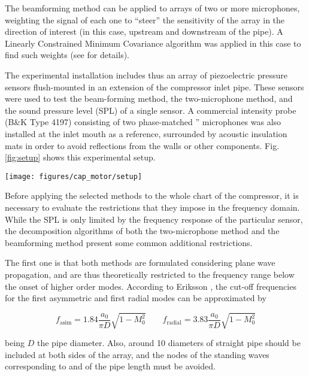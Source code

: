 The beamforming method can be applied to arrays of two or more microphones, weighting the signal of each one to ``steer'' the sensitivity of the array in the direction of interest (in this case, upstream and downstream of the pipe). A Linearly Constrained Minimum Covariance algorithm was applied in this case to find such weights (see \cite{pinero2000estimation} for details).

The experimental installation includes thus an array of piezoelectric pressure sensors flush-mounted in an extension of the compressor inlet pipe. These sensors were used to test the beam-forming method, the two-microphone method, and the sound pressure level (SPL) of a single sensor.
A commercial intensity probe (B\&K Type 4197) consisting of two phase-matched '' microphones was also installed at the inlet mouth as a reference, surrounded by acoustic insulation mats in order to avoid reflections from the walls or other components.  Fig. \ref{fig:setup} shows this experimental setup.

\begin{figure*}[t!]
\centering
\texttt{[image: figures/cap\_motor/setup]}
\caption{Experimental setup for the acoustic measurements.}
\label{fig:setup}
\end{figure*}

Before applying the selected methods to the whole chart of the compressor, it is necessary to evaluate the restrictions that they impose in the frequency domain. While the SPL is only limited by the frequency response of the particular sensor, the decomposition algorithms of both the two-microphone method and the beamforming method present some common additional restrictions.

The first one is that both methods are formulated considering plane wave propagation, and are thus theoretically restricted to the frequency range below the onset of higher order modes. According to Eriksson \cite{eriksson1980higher}, the cut-off frequencies for the first asymmetric and first radial modes can be approximated by

\begin{equation}\label{eq:modes}
	f_\text{asim}=1.84\frac{a_0}{\pi D}\sqrt{1-M_0^2}\qquad
	f_\text{radial}=3.83\frac{a_0}{\pi D}\sqrt{1-M_0^2}
\end{equation}

being $D$ the pipe diameter. Also, around 10 diameters of straight pipe should be included at both sides of the array, and the nodes of the standing waves corresponding to  and  of the pipe length must be avoided.

